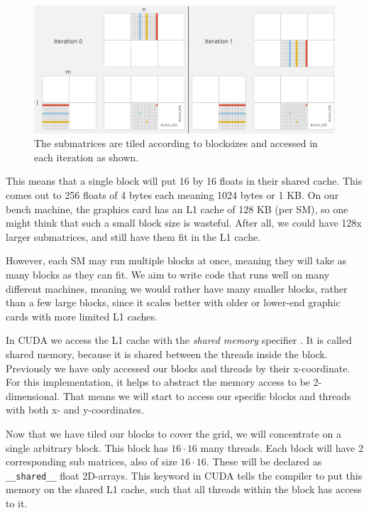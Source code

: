 \begin{figure}[h]
    \includegraphics[width=\textwidth]{Documents/Report/Figures/SharedMemory.png}
    \centering
    \caption{The submatrices are tiled according to blocksizes and accessed in each iteration as shown.}
    \label{fig:matrix_shared_memory}
\end{figure}

This means that a single block will put 16 by 16 floats in their shared cache. This comes out to 256 floats of 4 bytes each meaning 1024 bytes or 1 KB. On our bench machine, the graphics card has an L1 cache of 128 KB (per SM), so one might think that such a small block size is wasteful. After all, we could have 128x larger submatrices, and still have them fit in the L1 cache.

However, each SM may run multiple blocks at once, meaning they will take as many blocks as they can fit. We aim to write code that runs well on many different machines, meaning we would rather have many smaller blocks, rather than a few large blocks, since it scales better with older or lower-end graphic cards with more limited L1 caches.

In CUDA we access the L1 cache with the \textit{shared memory} specifier \cite[Sect. 7.2.3]{nvidia:cudadoc}. It is called shared memory, because it is shared between the threads inside the block.\\

\noindent Previously we have only accessed our blocks and threads by their x-coordinate. For this implementation, it helps to abstract the memory access to be 2-dimensional. That means we will start to access our specific blocks and threads with both x- and y-coordinates. 

Now that we have tiled our blocks to cover the grid, we will concentrate on a single arbitrary block. This block has $16 \cdot 16$ many threads. Each block will have 2 corresponding sub matrices, also of size $16 \cdot 16$. These will be declared as \texttt{\_\_shared\_\_} float 2D-arrays. This keyword in CUDA tells the compiler to put this memory on the shared L1 cache, such that all threads within the block has access to it. 

